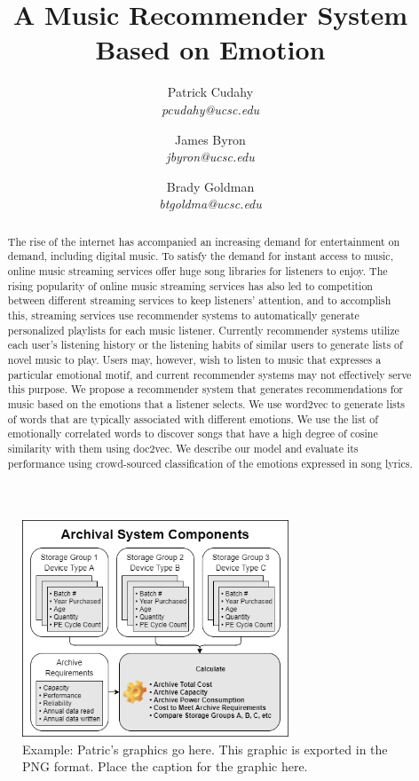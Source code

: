\documentclass[10pt,twocolumn]{article}
\begin{document}
\title{A Music Recommender System Based on Emotion}

\author{
{\rm Patrick Cudahy} \\
\textit{pcudahy@ucsc.edu}
\and
{\rm James Byron} \\
\textit{jbyron@ucsc.edu}
\and
{\rm Brady Goldman} \\
\textit{btgoldma@ucsc.edu}
}

\maketitle

\begin{abstract}
The rise of the internet has accompanied an increasing demand for entertainment on demand, including digital music.  To satisfy the demand for instant access to music, online music streaming services offer huge song libraries for listeners to enjoy.  The rising popularity of online music streaming services has also led to competition between different streaming services to keep listeners' attention, and to accomplish this, streaming services use recommender systems to automatically generate personalized playlists for each music listener.  Currently recommender systems utilize each user's listening history or the listening habits of similar users to generate lists of novel music to play.  Users may, however, wish to listen to music that expresses a particular emotional motif, and current recommender systems may not effectively serve this purpose.  We propose a recommender system that generates recommendations for music based on the emotions that a listener selects.  We use word2vec to generate lists of words that are typically associated with different emotions.  We use the list of emotionally correlated words to discover songs that have a high degree of cosine similarity with them using doc2vec.  We describe our model and evaluate its performance using crowd-sourced classification of the emotions expressed in song lyrics.
\end{abstract}

\begin{figure}[!htb]
\centering
\includegraphics[width=3.125in]{1.png}
\caption{Example: Patric's graphics go here.  This graphic is exported in the PNG format.  Place the caption for the graphic here.}
\label{fig:digraph}
\end{figure}
\end{document}
